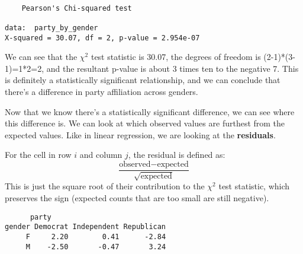 \documentclass[
  letterpaper,
  DIV=11,
  numbers=noendperiod]{scrreprt}
\newenvironment{Shaded}{\begin{snugshade}}{\end{snugshade}}
\newcommand{\CommentTok}[1]{\textcolor[rgb]{0.37,0.37,0.37}{#1}}
\newcommand{\DecValTok}[1]{\textcolor[rgb]{0.68,0.00,0.00}{#1}}
\newcommand{\FunctionTok}[1]{\textcolor[rgb]{0.28,0.35,0.67}{#1}}
\newcommand{\NormalTok}[1]{\textcolor[rgb]{0.00,0.23,0.31}{#1}}
\newcommand{\SpecialCharTok}[1]{\textcolor[rgb]{0.37,0.37,0.37}{#1}}
\begin{document}
\begin{verbatim}

    Pearson's Chi-squared test

data:  party_by_gender
X-squared = 30.07, df = 2, p-value = 2.954e-07
\end{verbatim}

We can see that the \(\chi^2\) test statistic is 30.07, the degrees of
freedom is (2-1)*(3-1)=1*2=2, and the resultant p-value is about 3 times
ten to the negative 7. This is definitely a statistically significant
relationship, and we can conclude that there's a difference in party
affiliation across genders.

Now that we know there's a statistically significant difference, we can
see where this difference is. We can look at which observed values are
furthest from the expected values. Like in linear regression, we are
looking at the \textbf{residuals}.

\begin{tcolorbox}[enhanced jigsaw, toptitle=1mm, colbacktitle=quarto-callout-note-color!10!white, breakable, leftrule=.75mm, left=2mm, opacityback=0, colframe=quarto-callout-note-color-frame, rightrule=.15mm, toprule=.15mm, bottomtitle=1mm, titlerule=0mm, title=\textcolor{quarto-callout-note-color}{\faInfo}\hspace{0.5em}{Residuals for a \(\chi^2\) Test}, arc=.35mm, colback=white, bottomrule=.15mm, opacitybacktitle=0.6, coltitle=black]

For the cell in row \(i\) and column \(j\), the residual is defined as:
\[
\frac{\text{observed} - \text{expected}}{\sqrt{\text{expected}}}
\] This is just the square root of their contribution to the \(\chi^2\)
test statistic, which preserves the sign (expected counts that are too
small are still negative).

\end{tcolorbox}

\begin{Shaded}
\end{Shaded}

\begin{verbatim}
      party
gender Democrat Independent Republican
     F     2.20        0.41      -2.84
     M    -2.50       -0.47       3.24
\end{verbatim}
\end{document}
